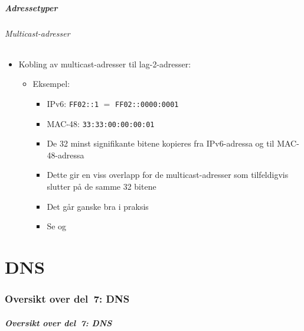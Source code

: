 \begin{frame}%
  \frametitle{Adressetyper}
  \framesubtitle{Multicast-adresser}
  \begin{itemize}%
  \item Kobling av multicast-adresser til lag-2-adresser:
    \begin{itemize}%
    \item Eksempel:
      \begin{itemize}%
      \item IPv6: \texttt{FF02::1} \(=\)
        \texttt{FF02::\alert{0000}:\alert{0001}}
      \item MAC-48:
        \texttt{33:33:\alert{00}:\alert{00}:\alert{00}:\alert{01}}
      \item De 32 minst signifikante bitene kopieres fra IPv6-adressa
        og til MAC-48-adressa
      \item Dette gir en viss overlapp for de multicast-adresser som
        tilfeldigvis slutter på de samme 32 bitene
      \item Det går ganske bra i praksis
      \item Se  og 
      \end{itemize}
    \end{itemize}
  \end{itemize}
\end{frame}

\part{DNS}

\begin{frame}
  \partpage
\end{frame}

\section*{Oversikt over del~7: DNS}
\begin{frame}[allowframebreaks]
  \frametitle{Oversikt over del~7: DNS}
    \tableofcontents%
\end{frame}

